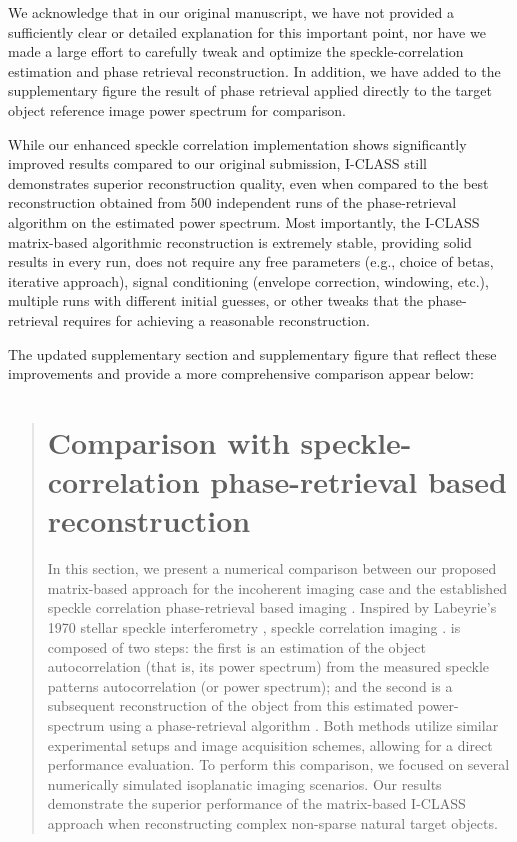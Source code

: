 \documentclass[12pt]{article}
\newenvironment{finished_ourresponse}
    {\begin{tcolorbox}[width=\linewidth,breakable,enhanced,colback=gray!5,colframe=finished_responsecolor!50,title=Response,left=5pt,right=5pt]}
    {\end{tcolorbox}}
\begin{document}
\begin{finished_ourresponse}
    We acknowledge that in our original manuscript, we have not provided a sufficiently clear or detailed explanation for this important point, nor have we made a large effort to carefully tweak and optimize the speckle-correlation estimation and phase retrieval reconstruction. In addition, we have added to the supplementary figure the result of phase retrieval applied directly to the target object reference image power spectrum for comparison. 
    
    While our enhanced speckle correlation implementation shows significantly improved results compared to our original submission, I-CLASS still demonstrates superior reconstruction quality, even when compared to the best reconstruction obtained from 500 independent runs of the phase-retrieval algorithm on the estimated power spectrum. Most importantly, the I-CLASS matrix-based algorithmic reconstruction is extremely stable, providing solid results in every run, does not require any free parameters (e.g., choice of betas, iterative approach), signal conditioning (envelope correction, windowing, etc.), multiple runs with different initial guesses, or other tweaks that the phase-retrieval requires for achieving a reasonable reconstruction. 
    
     The updated supplementary section and supplementary figure that reflect these improvements and provide a more comprehensive comparison appear below:

    \begin{quote}
        \setcounter{section}{291}
        \section{Comparison with speckle-correlation phase-retrieval based reconstruction}

        In this section, we present a numerical comparison between our proposed matrix-based approach for the incoherent imaging case and the established speckle correlation phase-retrieval based imaging  \cite{bert12, katz14}. Inspired by Labeyrie's 1970 stellar speckle interferometry \cite{labeyrie1970attainment}, speckle correlation imaging \cite{bert12, katz14}. is composed of two steps: the first is an estimation of the object autocorrelation (that is, its power spectrum) from the measured speckle patterns autocorrelation (or power spectrum); and the second is a subsequent reconstruction of the object from this estimated power-spectrum using a phase-retrieval algorithm \cite{fienup1982phase}. 
        Both methods utilize similar experimental setups and image acquisition schemes, allowing for a direct performance evaluation. To perform this comparison, we focused on several numerically simulated isoplanatic imaging scenarios. Our results demonstrate the superior performance of the matrix-based I-CLASS approach when reconstructing complex non-sparse natural target objects. 
        

\end{quote}
\end{finished_ourresponse}
\end{document}

